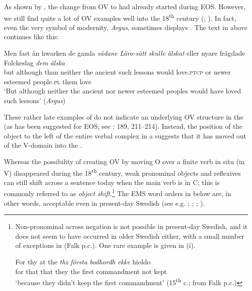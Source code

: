 \documentclass[output=paper]{langscibook}
\begin{document}
As shown by \citet{Delsing1999}, the change from OV to  had already started during EOS. However, we still find quite a lot of OV examples well into the 18\textsuperscript{th} century (\citealt{Petzell2011}; \citealt{Sangfelt2019}). In fact, even the very symbol of modernity, \textit{Argus}, sometimes displays . The text in  above continues like this:


\ea
\gll Men  fast      än   hwarken de gamla \textit{sådane} \textit{Läro-sätt} \textit{skulle} \textit{älskat} eller   nyare     frägdade   Folckeslag \textit{dem} \textit{älska}\\
but     although   than   neither   the ancient  such       lessons    would  love\textsc{.ptcp} or  newer  esteemed people.\textsc{pl}  them love\\
\glt ‘But although neither the ancient nor newer esteemed peoples would have loved such lessons’ (\textit{Argus})
\z

These rather late examples of  do not indicate an underlying OV structure in the  (as has been suggested for EOS; see \citealt{Delsing1999}: 189, 211–214). Instead, the position of the object to the left of the entire verbal complex in a  suggests that it has moved out of the V-domain into the  \citep{Petzell2011}. 



Whereas the possibility of creating OV by moving O over a finite verb in situ (in V) disappeared during the 18\textsuperscript{th} century, weak pronominal objects and reflexives can still shift across a sentence  today when the main verb is in C; this is commonly referred to as \textit{object shift}.\footnote{Non-pronominal
     across negation is not possible in present-day Swedish, and it does not seem to have occurred in older Swedish either, with a small number of exceptions in  (Falk p.c.). One rare example is given in (i).

    \ea
    \gll  For thy at   the \textit{thz} \textit{första} \textit{bodhordh} \textit{ekke} hioldo\\
        for that that   they   the first   commandment   not   kept\\
        \glt ‘because they didn’t keep the first commandment’ (15\textsuperscript{th} c.; from Falk p.c.)
    \z
    }
The EMS word orders in  below are, in other words, acceptable even in present-day Swedish (see e.g. \citealt{Holmberg1986}; \citealt{Andreasson2008}; \citealt{Bentzen2014}; \citealt{Erteschik-ShirJosefsson2017}).
\end{document}
